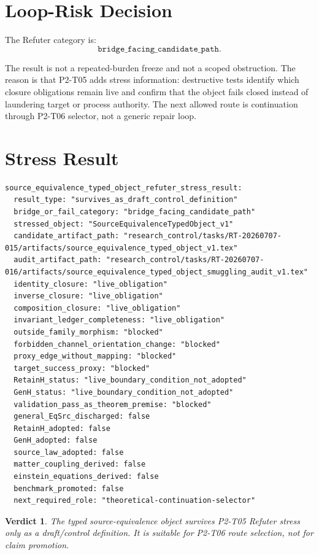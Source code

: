 \documentclass[11pt]{article}
\newtheorem{verdict}{Verdict}
\begin{document}
\section{Loop-Risk Decision}

The Refuter category is:
\[
  \texttt{bridge\_facing\_candidate\_path}.
\]

The result is not a repeated-burden freeze and not a scoped obstruction. The
reason is that P2-T05 adds stress information: destructive tests identify
which closure obligations remain live and confirm that the object fails closed
instead of laundering target or process authority. The next allowed route is
continuation through P2-T06 selector, not a generic repair loop.

\section{Stress Result}

\begin{verbatim}
source_equivalence_typed_object_refuter_stress_result:
  result_type: "survives_as_draft_control_definition"
  bridge_or_fail_category: "bridge_facing_candidate_path"
  stressed_object: "SourceEquivalenceTypedObject_v1"
  candidate_artifact_path: "research_control/tasks/RT-20260707-015/artifacts/source_equivalence_typed_object_v1.tex"
  audit_artifact_path: "research_control/tasks/RT-20260707-016/artifacts/source_equivalence_typed_object_smuggling_audit_v1.tex"
  identity_closure: "live_obligation"
  inverse_closure: "live_obligation"
  composition_closure: "live_obligation"
  invariant_ledger_completeness: "live_obligation"
  outside_family_morphism: "blocked"
  forbidden_channel_orientation_change: "blocked"
  proxy_edge_without_mapping: "blocked"
  target_success_proxy: "blocked"
  RetainH_status: "live_boundary_condition_not_adopted"
  GenH_status: "live_boundary_condition_not_adopted"
  validation_pass_as_theorem_premise: "blocked"
  general_EqSrc_discharged: false
  RetainH_adopted: false
  GenH_adopted: false
  source_law_adopted: false
  matter_coupling_derived: false
  einstein_equations_derived: false
  benchmark_promoted: false
  next_required_role: "theoretical-continuation-selector"
\end{verbatim}

\begin{verdict}
The typed source-equivalence object survives P2-T05 Refuter stress only as a
draft/control definition. It is suitable for P2-T06 route selection, not for
claim promotion.
\end{verdict}
\end{document}

